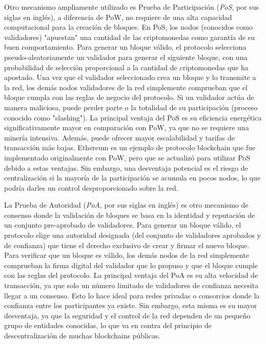 Otro mecanismo ampliamente utilizado es Prueba de Participación (\textit{PoS}, por sus siglas en inglés), a diferencia de PoW, no requiere de una alta capacidad computacional para la creación de bloques. En PoS, los nodos (conocidos como validadores) "apuestan" una cantidad de las criptomonedas como garantía de su buen comportamiento. Para generar un bloque válido, el protocolo selecciona pseudo-aleatoriamente un validador para generar el siguiente bloque, con una probabilidad de selección proporcional a la cantidad de criptomonedas que ha apostado. Una vez que el validador seleccionado crea un bloque y lo transmite a la red, los demás nodos validadores de la red simplemente comprueban que el bloque cumpla con las reglas de negocio del protocolo. Si un validador actúa de manera maliciosa, puede perder parte o la totalidad de su participación (proceso conocido como "slashing"). La principal ventaja del PoS es su eficiencia energética significativamente mayor en comparación con PoW, ya que no se requiere una minería intensiva. Además, puede ofrecer mayor escalabilidad y tarifas de transacción más bajas. Ethereum es un ejemplo de protocolo blockchain que fue implementado originalmente con PoW, pero que se actualizó para utilizar PoS debido a estas ventajas. Sin embargo, una desventaja potencial es el riesgo de centralización si la mayoría de la participación se acumula en pocos nodos, lo que podría darles un control desproporcionado sobre la red.

La Prueba de Autoridad (\textit{PoA}, por sus siglas en inglés) es otro mecanismo de consenso donde la validación de bloques se basa en la identidad y reputación de un conjunto pre-aprobado de validadores. Para generar un bloque válido, el protocolo elige una autoridad designada (del conjunto de validadores aprobados y de confianza) que tiene el derecho exclusivo de crear y firmar el nuevo bloque. Para verificar que un bloque es válido, los demás nodos de la red simplemente comprueban la firma digital del validador que lo propuso y que el bloque cumple con las reglas del protocolo. La principal ventaja del PoA es su alta velocidad de transacción, ya que solo un número limitado de validadores de confianza necesita llegar a un consenso. Esto lo hace ideal para redes privadas o consorcios donde la confianza entre los participantes ya existe. Sin embargo, esta misma es su mayor desventaja, ya que la seguridad y el control de la red dependen de un pequeño grupo de entidades conocidas, lo que va en contra del principio de descentralización de muchas blockchains públicas.

